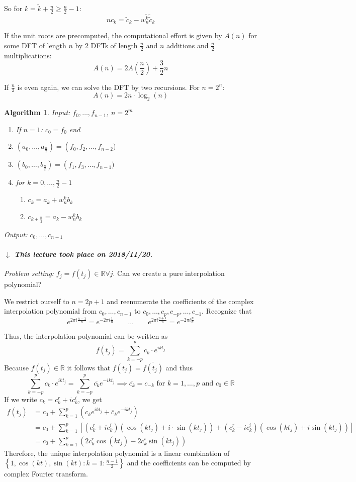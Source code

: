 \documentclass[a4paper]{article}
\numberwithin{lecref}{section}
\theoremstyle{break}
\newtheorem{algorithm}{Algorithm}
\newcommand{\dateref}[1]{%
  \begin{mdframed}[backgroundcolor=gray!10,innerbottommargin=0pt,innertopmargin=0pt]
    \paragraph{\textit{$\downarrow$ This lecture took place on #1.}}%
  \end{mdframed}%
}
\newcommand{\Set}[1]{\left\{#1\right\}}
\begin{document}
So for $k = \tilde k + \frac n2 \geq \frac n2 - 1$:
\[ nc_k = \tilde c_k - w_n^{\tilde k} \tilde{\tilde{c}}_k \]

If the unit roots are precomputed, the computational effort is given by $A(n)$ for some DFT of length $n$ by $2$ DFTs of length $\frac n2$ and $n$ additions and $\frac n2$ multiplications:
\[ A(n) = 2A(\frac n2) + \frac 32 n \]

If $\frac n2$ is even again, we can solve the DFT by two recursions. For $n = 2^n$:
\[ A(n) = 2n \cdot \log_2(n) \]

\begin{algorithm}
  \emph{Input:} $f_0, \dots, f_{n-1}$, $n = 2^m$
  \begin{enumerate}
    \item If $n = 1$: $c_0 = f_0$ end
    \item $(a_0, \dots, a_{\frac n2}) = \operatorname(f_0, f_2, \dots, f_{n-2})$
    \item $(b_0, \dots, b_{\frac n2}) = \operatorname(f_1, f_3, \dots, f_{n-1})$
    \item for $k = 0, \dots, \frac n2 - 1$
      \begin{enumerate}
        \item $c_k = a_k + w_n^k b_k$
        \item $c_{k + \frac n2} = a_k - w_n^k b_k$
      \end{enumerate}
  \end{enumerate}
  \emph{Output:} $c_0, \dots, c_{n-1}$
\end{algorithm}

\dateref{2018/11/20}

\emph{Problem setting:}
$f_j = f(t_j) \in \mathbb R \forall j$. Can we create a pure interpolation polynomial?

We restrict ourself to $n = 2p + 1$ and reenumerate the coefficients of the complex interpolation polynomial from $c_0, \dots, c_{n-1}$ to $c_0, \dots, c_p, c_{-p}, \dots, c_{-1}$. Recognize that
\[ e^{2\pi i \frac{n-1}{n}} = e^{-2\pi i \frac 1n} \qquad \dots \qquad e^{2\pi i \frac{p +  1}{n}} = e^{-2\pi i \frac pn} \]

Thus, the interpolation polynomial can be written as
\[ f(t_j) = \sum_{k=-p}^{p} c_k \cdot e^{ik t_j} \]
Because $f(t_j) \in \mathbb R$ it follows that $f(t_j) = \overline{f(t_j)}$ and thus
\[ \sum_{k=-p}^{p} c_k \cdot e^{ikt_j} = \sum_{k=-p}^p \overline{c_k} e^{-ikt_j} \implies \overline{c_k} = c_{-k} \text{ for } k = 1, \dots, p \text{ and } c_0 \in \mathbb R \]
If we write $c_k = c^r_k + i c_k^i$, we get
\begin{align*}
  f(t_j) &= c_0 + \sum_{k=1}^p (c_k e^{ikt_j} + \overline{c}_k e^{-ikt_j}) \\
    &= c_0 + \sum_{k=1}^p \left[(c_k^r + ic_k^i)(\cos(kt_j) + i \cdot \sin(kt_j)) + (c_k^r - ic_k^i)(\cos(kt_j) + i \sin(kt_j))\right] \\
    &= c_0 + \sum_{k=1}^p (2 c_k^r \cos(kt_j) - 2 c_k^i \sin(kt_j))
\end{align*}
Therefore, the unique interpolation polynomial is a linear combination of $\Set{1, \cos(kt), \sin(kt): k = 1: \frac{n-1}2}$ and the coefficients can be computed by complex Fourier transform.
\end{document}
